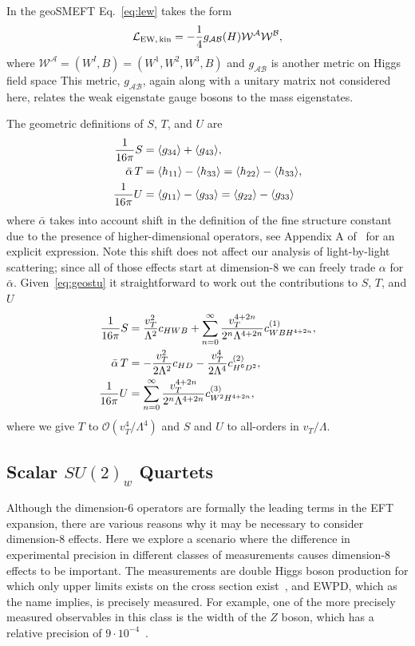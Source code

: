 In the geoSMEFT Eq.~\eqref{eq:lew} takes the form
\begin{equation}
\mathcal{L}_{\rm EW,\, kin} = - \frac{1}{4} g_{\mathcal{A} \mathcal{B}}(H) \mathcal{W}^\mathcal{A} \mathcal{W}^\mathcal{B} ,
\end{equation}
where $\mathcal{W}^\mathcal{A} = (W^I, B) = (W^1, W^2, W^3, B)$ and $g_{\mathcal{A} \mathcal{B}}$ is another metric on Higgs field space
This metric, $g_{\mathcal{A} \mathcal{B}}$, again along with a unitary matrix not considered here, relates the weak eigenstate gauge bosons to the mass eigenstates.

The geometric definitions of $S$, $T$, and $U$ are
\begin{align}
\label{eq:geostu}
\frac{1}{16\pi} S &= \langle g_{34} \rangle + \langle g_{43} \rangle , \nonumber\\ 
\bar \alpha\, T &= \langle h_{11} \rangle - \langle h_{33} \rangle = \langle h_{22} \rangle - \langle h_{33} \rangle , \nonumber\\ 
\frac{1}{16\pi} U &= \langle g_{11} \rangle - \langle g_{33} \rangle = \langle g_{22} \rangle - \langle g_{33} \rangle
\end{align}
where $\bar \alpha$ takes into account shift in the definition of the fine structure constant due to the presence of higher-dimensional operators, see Appendix A of~\cite{Hays:2020scx} for an explicit expression.
Note this shift does not affect our analysis of light-by-light scattering; since all of those effects start at dimension-8 we can freely trade $\alpha$ for $\bar\alpha$.
Given~\eqref{eq:geostu} it straightforward to work out the contributions to $S$, $T$, and $U$
\begin{align}
\label{eq:stu}
\frac{1}{16\pi} S &= \frac{v_T^2}{\Lambda^2} c_{HWB} + \sum_{n=0}^\infty \frac{v_T^{4+2n}}{2^n \Lambda^{4+2n}} c_{WBH^{4+2n}}^{(1)}, \nonumber\\ 
\bar\alpha\, T &= - \frac{v_T^2}{2 \Lambda^2} c_{HD} - \frac{v_T^4}{2 \Lambda^4} c_{H^6D^2}^{(2)} , \nonumber\\ 
\frac{1}{16\pi} U &= \sum_{n=0}^\infty \frac{v_T^{4+2n}}{2^n \Lambda^{4+2n}} c_{W^2H^{4+2n}}^{(3)} ,
\end{align}
where we give $T$ to $\mathcal{O}(v_T^4 / \Lambda^4)$ and $S$ and $U$ to all-orders in $v_T / \Lambda$.

\subsection{Scalar $SU(2)_w$ Quartets}
\label{sec:quartets}

Although the dimension-6 operators are formally the leading terms in the EFT expansion, there are various reasons why it may be necessary to consider dimension-8 effects.
Here we explore a scenario where the difference in experimental precision in different classes of measurements causes dimension-8 effects to be important.
The measurements are double Higgs boson production for which only upper limits exists on the cross section exist~\cite{Sirunyan:2018ayu, Aad:2019yxi}, and EWPD, which as the name implies, is precisely measured.
For example, one of the more precisely measured observables in this class is the width of the $Z$ boson, which has a relative precision of $9 \cdot 10^{-4}$~\cite{ALEPH:2005ab}.

